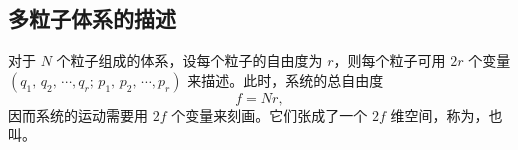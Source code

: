 		\begin{myExample}[转子]
			
		\end{myExample}%
		
	\subsection{多粒子体系的描述}
		对于 $N$ 个粒子组成的体系，设每个粒子的自由度为 $r$，则每个粒子可用 $2r$ 个变量 $(q_1, \, q_2, \, \cdots, q_r; \allowbreak \, p_1, \, p_2, \, \cdots, p_r)$ 来描述。此时，系统的总自由度 %
		\begin{equation}
			f = Nr \comma
		\end{equation}
		因而系统的运动需要用 $2f$ 个变量来刻画。它们张成了一个 $2f$ 维空间，称为，也叫。

\raggedbottom%
\pagebreak
